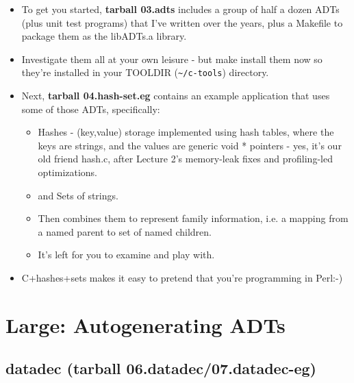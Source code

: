 \documentclass[handout,]{beamer}
\newcommand{\pitem}{\pause \item}
\begin{document}
\begin{frame}[fragile]
    \begin{itemize}
    \item
     To get you started, {\bf tarball 03.adts} includes a group
     of half a dozen ADTs (plus unit test programs) that I've written over
     the years,
     plus a Makefile to package them as the \alert{libADTs.a} library.

    \pitem
      Investigate them all at your own leisure - but \alert{make install}
      them now so
      they're installed in your TOOLDIR (\verb+~/c-tools+) directory.

    \pitem
      Next, {\bf tarball 04.hash-set.eg} contains an example application
      that uses some of those ADTs, specifically:

      \begin{itemize}
      \pitem
        \alert{Hashes} - \alert{(key,value)} storage implemented using hash
	tables, where the keys are strings, and the values are generic
	\alert{void *} pointers - yes, it's our old friend hash.c, after
	Lecture 2's memory-leak fixes and profiling-led optimizations.

      \pitem
        and \alert{Sets of strings}.

      \pitem
        Then combines them to represent family information, i.e.
        a mapping from a \alert{named parent} to \alert{set of named children}.

      \item
        It's left for you to examine and play with.

      \end{itemize}
      
      \pitem
        \alert{C+hashes+sets} makes it easy to pretend that you're programming
	in Perl:-)
    \end{itemize}
\end{frame}

\section{Large: Autogenerating ADTs}
\subsection{datadec (tarball 06.datadec/07.datadec-eg)}
\end{document}
